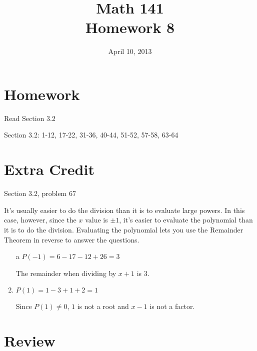 \documentclass{exam}
\date{April 10, 2013}
\author{}
\title{Math 141 \\ Homework 8}
\begin{document}
  \maketitle

  \section{Homework}

  \begin{itemize*}
    \item Read Section 3.2
    \item Section 3.2: 1-12, 17-22, 31-36, 40-44, 51-52, 57-58, 63-64
  \end{itemize*}

  \section{Extra Credit}
  Section 3.2, problem 67

  \ifprintanswers
    \begin{solution}
      It's usually easier to do the division than it is to evaluate large powers.  In this case, however, since the $x$
      value is $\pm 1$, it's easier to evaluate the polynomial than it is to do the division.  Evaluating the polynomial
      lets you use the {Remainder Theorem} in reverse to answer the questions.

      \begin{enumerate}[a]
        \item[a] 
          $P(-1) = 6 - 17 - 12 + 26 = 3$

          The remainder when dividing by $x + 1$ is 3.

        \item
          $P(1) = 1 - 3 + 1 + 2 = 1$

          Since $P(1) \neq 0$, $1$ is not a root and $x - 1$ is not a factor.

      \end{enumerate}

    \end{solution}

  \fi

  \section{Review}
\end{document}
